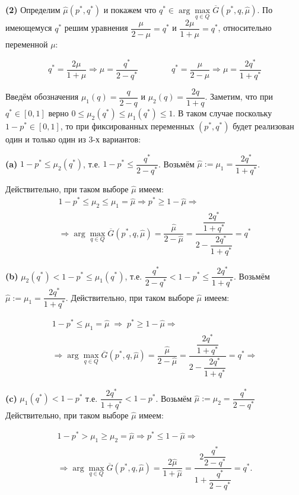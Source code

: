 \textbf{(2)} Определим $\hat \mu(p^*, q^*)$ и покажем что 
$q^* \in \arg \max \limits_{q \in Q} \overline G(p^*, q, \hat \mu) $.
По имеющемуся $q^*$ решим уравнения $\dfrac{\mu}{2 - \mu}=q^*$ и
$\dfrac{2 \mu}{1 + \mu}=q^*$, относительно переменной $\mu$:

$$
	q^*=\dfrac{2 \mu}{1 + \mu} \Rightarrow \mu = \frac{q^*}{2 - q^*} \qquad \qquad
	q^*=\dfrac{\mu}{2 - \mu} \Rightarrow \mu = \frac{2 q^*}{1 + q^*}
$$

Введём обозначения $\mu_1(q) = \dfrac{q}{2 - q}$ и 
$\mu_2(q) = \dfrac{2 q}{1 + q}$. Заметим, что при $q^* \in [0, 1]$ 
верно $0 \leqslant \mu_2(q^*) \leqslant \mu_1(q^*) \leqslant 1$.
В таком случае поскольку $1 - p^* \in [0, 1]$, то при фиксированных переменных 
$(p^*, q^*)$ будет реализован один и только один из 3-х вариантов:

\textbf{(a)}
$1 - p^* \leqslant \mu_2(q^*)$, т.е.  $1 - p^* \leqslant \dfrac{q^*}{2 - q^*}$.
Возьмём $\hat \mu := \mu_1 = \dfrac{2 q^*}{1 + q^*}$.

Действительно, при таком выборе $\hat{\mu}$ имеем: 
\begin{gather*}
	1 - p^* \leqslant \mu_2 \leqslant \mu_1 = \hat \mu \Rightarrow
	p^* \geqslant 1 - \hat \mu \Rightarrow 
	\\	
	\Rightarrow \arg \max \limits_{q \in Q} \overline G(p^*, q, \hat \mu) =
	\dfrac{\hat{\mu}}{2-\hat{\mu}} =
	\dfrac{\dfrac{2 q^*}{1 + q^*}}{2 - \dfrac{2 q^*}{1 + q^*}} =
	q^*
\end{gather*} 


\textbf{(b)}
$\mu_2(q^*) < 1-p^* \leqslant \mu_1(q^*)$, т.е.  
$\dfrac{q^*}{2 - q^{*}} < 1 - p^* \leqslant \dfrac{2 q^*}{1 + q^*}$.
Возьмём $\hat \mu := \mu_1 = \dfrac{2 q^*}{1 + q^*}$.
Действительно, при таком выборе $\hat \mu$ имеем:

\begin{gather*}
	1 - p^* \leq \mu_1 = \hat \mu 
	\; \Rightarrow \;
	p^* \geqslant 1 - \hat \mu \Rightarrow 
	\\
	\Rightarrow  \arg \max \limits_{q \in Q} \overline G(p^*, q, \hat \mu) =
	\dfrac{\hat \mu}{2 - \hat \mu} =
	\dfrac{\dfrac{2 q^*}{1 + q^*}}{2 - \dfrac{2 q^*}{1 + q^*}}=
	q^* \Rightarrow
\end{gather*} 



\textbf{(c)} 
$\mu_1(q^*) < 1 - p^*$ т.е. $\dfrac{2 q^*}{1 + q^*} < 1 - p^*$.
Возьмём $\hat \mu := \mu_2 = \dfrac{q^*}{2 - q^*}$
Действительно, при таком выборе $\hat \mu$ имеем:

\begin{gather*}
	1 - p^* > \mu_1 \geqslant \mu_2 = \hat \mu \Rightarrow
	p^* \leqslant 1 - \hat \mu \Rightarrow 
	\\	
	\Rightarrow \arg \max \limits_{q \in Q} \overline G(p^*, q, \hat \mu) =
	\dfrac{2 \hat \mu}{1 + \hat \mu} =
	\dfrac{2 \dfrac{q^*}{2 - q^*}}{1 + \dfrac{q^*}{2 - q^*}} =
	q^*.
\end{gather*}

